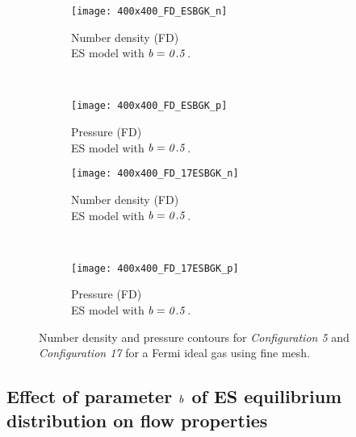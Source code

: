 \documentclass{rsproca}%
\begin{document}
\begin{figure}
        \centering
        \begin{subfigure}[b]{0.45\textwidth}
                \centering
                \texttt{[image: 400x400\_FD\_ESBGK\_n]}
                \caption{Number density (FD) \\ ES model with $\it{b=0.5}$.}
                \label{fig:400x400_FD_ESBGK_n}
        \end{subfigure}%
				~ %
				\begin{subfigure}[b]{0.45\textwidth}
                \centering
                \texttt{[image: 400x400\_FD\_ESBGK\_p]}
                \caption{Pressure (FD) \\ ES model with $\it{b=0.5}$.}
                \label{fig:400x400_FD_ESBGK_p}
        \end{subfigure}%

					\begin{subfigure}[b]{0.45\textwidth}
                \centering
                \texttt{[image: 400x400\_FD\_17ESBGK\_n]}
                \caption{Number density (FD) \\ ES model with $\it{b=0.5}$.}
                \label{fig:400x400_FD_17ESBGK_n}
        \end{subfigure}%
				~ %
				\begin{subfigure}[b]{0.45\textwidth}
                \centering
                \texttt{[image: 400x400\_FD\_17ESBGK\_p]}
                \caption{Pressure (FD) \\ ES model with $\it{b=0.5}$.}
                \label{fig:400x400_FD_17ESBGK_p}
        \end{subfigure}%
				\caption{Number density and pressure contours for \emph{Configuration 5} and \emph{Configuration 17} for a Fermi ideal gas using fine mesh.}
				\label{fig:Mesh_refinement}
\end{figure}

\subsection{Effect of parameter $\it{b}$ of ES equilibrium distribution on flow properties }
\end{document}
